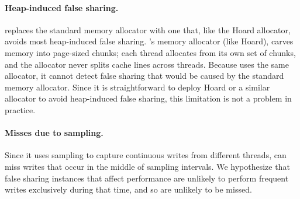 \paragraph{Heap-induced false sharing.}  
\sheriff{} replaces the standard memory allocator with one that, like the Hoard allocator, avoids most heap-induced false sharing. \sheriff{}'s memory allocator (like Hoard), carves memory into page-sized chunks; each thread allocates
from its own set of chunks, and the allocator never splits cache lines across threads. Because \SheriffDetect{} uses the same allocator, it cannot detect false sharing that would be caused by the standard memory allocator. Since it is straightforward to deploy Hoard or a similar allocator to avoid heap-induced false sharing, this limitation is not a problem in practice.

\paragraph{Misses due to sampling.}  Since it uses sampling to
  capture continuous writes from different threads, \SheriffDetect{} can miss writes that occur in the middle of sampling intervals. We hypothesize that false sharing instances that affect performance are unlikely to perform frequent writes exclusively during that time, and so are unlikely to be missed.
